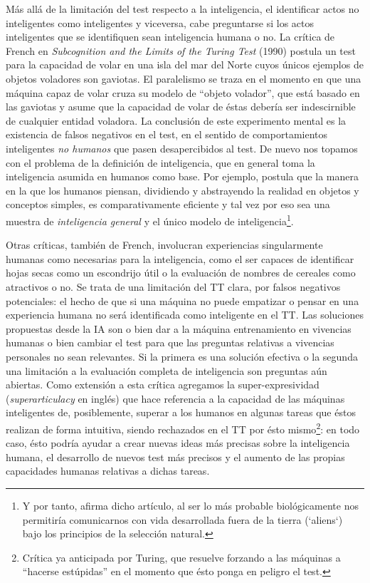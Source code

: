 \documentclass[12pt]{memoir}
\begin{document}
Más allá de la limitación del test respecto a la inteligencia, el identificar actos no inteligentes como inteligentes y viceversa, cabe preguntarse si los actos inteligentes que se identifiquen sean inteligencia humana o no. La crítica de French en \textit{Subcognition and the Limits of the Turing Test} (1990) postula un test para la capacidad de volar en una isla del mar del Norte cuyos únicos ejemplos de objetos voladores son gaviotas. El paralelismo se traza en el momento en que una máquina capaz de volar cruza su modelo de ``objeto volador'', que está basado en las gaviotas y asume que la capacidad de volar de éstas debería ser indescirnible de cualquier entidad voladora. La conclusión de este experimento mental es la existencia de falsos negativos en el test, en el sentido de comportamientos inteligentes \textit{no humanos} que pasen desapercibidos al test. De nuevo nos topamos con el problema de la definición de inteligencia, que en general toma la inteligencia asumida en humanos como base. Por ejemplo, \parencite{aliens} postula que la manera en la que los humanos piensan, dividiendo y abstrayendo la realidad en objetos y conceptos simples, es comparativamente eficiente y tal vez por eso sea una muestra de \textit{inteligencia general} y el único modelo de inteligencia\footnote{Y por tanto, afirma dicho artículo, al ser lo más probable biológicamente nos permitiría comunicarnos con vida desarrollada fuera de la tierra (`aliens`) bajo los principios de la selección natural.}. 

Otras críticas, también de French, involucran experiencias singularmente humanas como necesarias para la inteligencia, como el ser capaces de identificar hojas secas como un escondrijo útil o la evaluación de nombres de cereales como atractivos o no. Se trata de una limitación del TT clara, por falsos negativos potenciales: el hecho de que si una máquina no puede empatizar o pensar en una experiencia humana no será identificada como inteligente en el TT. Las soluciones propuestas desde la IA son o bien dar a la máquina entrenamiento en vivencias humanas o bien cambiar el test para que las preguntas relativas a vivencias personales no sean relevantes. Si la primera es una solución efectiva o la segunda una limitación a la evaluación completa de inteligencia son preguntas aún abiertas. Como extensión a esta crítica agregamos la super-expresividad (\textit{superarticulacy} en inglés) que hace referencia a la capacidad de las máquinas inteligentes de, posiblemente, superar a los humanos en algunas tareas que éstos realizan de forma intuitiva, siendo rechazados en el TT por ésto mismo\footnote{Crítica ya anticipada por Turing, que resuelve forzando a las máquinas a ``hacerse estúpidas'' en el momento que ésto ponga en peligro el test.}: en todo caso, ésto podría ayudar a crear nuevas ideas más precisas sobre la inteligencia humana, el desarrollo de nuevos test más precisos y el aumento de las propias capacidades humanas relativas a dichas tareas.
\end{document}
